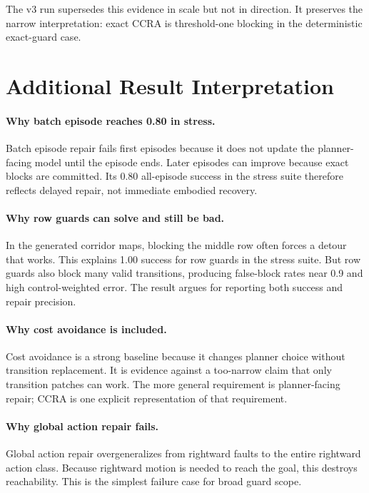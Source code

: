 \documentclass{article}
\begin{document}
The v3 run supersedes this evidence in scale but not in direction. It preserves the narrow interpretation: exact CCRA is threshold-one blocking in the deterministic exact-guard case.

\section{Additional Result Interpretation}

\paragraph{Why batch episode reaches 0.80 in stress.}
Batch episode repair fails first episodes because it does not update the planner-facing model until the episode ends. Later episodes can improve because exact blocks are committed. Its 0.80 all-episode success in the stress suite therefore reflects delayed repair, not immediate embodied recovery.

\paragraph{Why row guards can solve and still be bad.}
In the generated corridor maps, blocking the middle row often forces a detour that works. This explains 1.00 success for row guards in the stress suite. But row guards also block many valid transitions, producing false-block rates near 0.9 and high control-weighted error. The result argues for reporting both success and repair precision.

\paragraph{Why cost avoidance is included.}
Cost avoidance is a strong baseline because it changes planner choice without transition replacement. It is evidence against a too-narrow claim that only transition patches can work. The more general requirement is planner-facing repair; CCRA is one explicit representation of that requirement.

\paragraph{Why global action repair fails.}
Global action repair overgeneralizes from rightward faults to the entire rightward action class. Because rightward motion is needed to reach the goal, this destroys reachability. This is the simplest failure case for broad guard scope.
\end{document}
